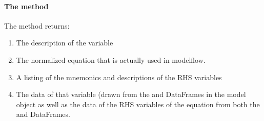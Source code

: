 \documentclass[letterpaper,10pt,english]{jupyterBook}
\begin{document}
\paragraph{The  method}
\label{\detokenize{content/05_WBModels/LoadingWBModel:the-show-method}}
\sphinxAtStartPar
The  method returns:
\begin{enumerate}
%
\item {} 
\sphinxAtStartPar
The description of the variable

\item {} 
\sphinxAtStartPar
The normalized equation that is actually used in modelflow.

\item {} 
\sphinxAtStartPar
A listing of the mnemonics and descriptions of the RHS variables

\item {} 
\sphinxAtStartPar
The data of that variable (drawn from the  and  DataFrames in the model object as well as the data of the RHS variables of the equation from both the  and  DataFrames.

\end{enumerate}
\end{document}
